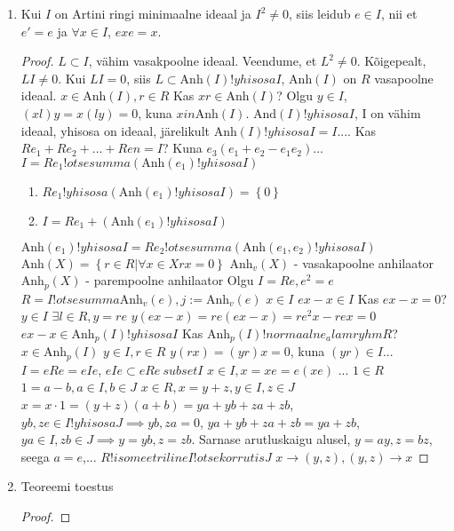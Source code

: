 \documentclass[12pt]{report}
\numberwithin{equation}{section}
\theoremstyle{definition}
\theoremstyle{plain}
\begin{document}
\begin{enumerate}
\item Kui $I$ on Artini ringi minimaalne ideaal ja $I^2 \neq 0$, siis leidub $e \in I$, nii et $e' = e$ ja $\forall x \in I$, $exe=x$.
\begin{proof}
$L \subset I$, vähim vasakpoolne ideaal. 
Veendume, et $L^2 \neq 0$. Kõigepealt, $LI \neq 0$. Kui $LI =0$, siis $L \subset \text{Anh}\left( I \right) !yhisosa I$, $\text{Anh} \left( I \right)$ on $R$ vasapoolne ideaal.
$ x \in \text{Anh} \left( I \right), r \in R$
Kas $xr \in \text{Anh} \left( I \right)$? Olgu $y \in I$,  $(xl)y  = x(ly) = 0$, kuna $x in \text{Anh} \left( I \right)$. 
$\text{And} \left( I \right) !yhisosa I$, I on vähim ideaal, yhisosa on ideaal, järelikult $\text{Anh} \left( I \right) !yhisosa I = I$....
Kas $R e_1 + R e_2 + ... + Ren = I$?
Kuna $e_3 (e_1 + e_2 - e_{1} e_{2}) ...$
$I = R e_{1} !otsesumma (\text{Anh} \left( e_1 \right) !yhisosa I )$
\begin{enumerate}
\item $R e_1 !yhisosa (\text{Anh} \left( e_1 \right) !yhisosa I ) = \left\lbrace 0 \right\rbrace$
\item $I = R e_1 + (\text{Anh} \left( e_1 \right) !yhisosa I )$
\end{enumerate}
$\text{Anh} \left( e_1 \right) !yhisosa I = R e_2 !otsesumma (\text{Anh} \left( e_1, e_2 \right) !yhisosa I )$
$\text{Anh} \left( X \right) = \left\lbrace r \in R | \forall x \in X rx = 0  \right\rbrace$
$\text{Anh}_v(X)$ - vasakapoolne anhilaator
$\text{Anh}_p(X)$ - parempoolne anhilaator
Olgu $I = Re, e^2 = e $
$R = I !otsesumma \text{Anh}_v (e), j := \text{Anh}_v (e) $
$ x \in I$
$ex -x \in I$
Kas $ex - x = 0 $?
$y \in I$
$\exists l \in R , y = re$
$y \left( ex - x \right) = re \left( ex - x \right) = r e^2 x - r e x = 0$
$ex - x \in \text{Anh}_p(I) !yhisosa I$
Kas $\text{Anh}_p(I) !normaalne_alamryhm R$?
$x \in \text{Anh}_p(I)$
$y \in I, r \in R$
$y \left( rx \right) = \left( yr \right) x = 0 $, kuna $\left( yr \right) \in I$...
$I = eRe = eIe$,
$eIe \subset eRe \ subset I$
$x \in I, x = xe = e(xe)$
...
$1 \in R$
$ 1 = a - b, a \in I, b \in J$
$x \in R, x = y + z, y \in I, z \in J$
$x = x \cdot 1 = (y+z)(a+b) = ya + yb + za + zb$, $yb,ze \in I !yhisosa J \implies yb,za = 0$, $ya + yb + za + zb = ya + zb$, $ya \in I, zb \in J \implies y = yb ,  z = zb$. Sarnase arutluskaigu alusel, $y = ay, z = bz$, seega $a=e$,...
$R !isomeetriline I !otsekorrutis J$
$x \to (y,z), (y,z) \to x$
\end{proof}
\item Teoreemi toestus
\begin{proof}

\end{proof}
\end{enumerate}
\end{document}
